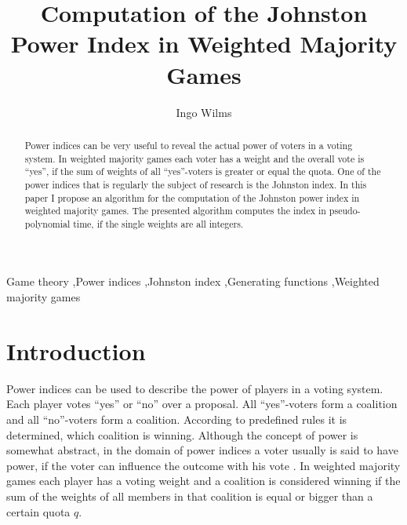 \documentclass[review]{elsarticle}
\theoremstyle{defn}
\theoremstyle{Pseudo-Code}
\begin{document}
\begin{frontmatter}

\title{Computation of the Johnston Power Index in Weighted Majority Games}

\author{Ingo Wilms}




\begin{abstract}
Power indices can be very useful to reveal the actual power of voters in a voting system. In weighted majority games each voter has a weight and the overall vote is ``yes'', if the sum of weights of all ``yes''-voters is greater or equal the quota.
One of the power indices that is regularly the subject of research is the Johnston index.
In this paper I propose an algorithm for the computation of the Johnston power index in weighted majority games.
The presented algorithm computes the index in pseudo-polynomial time, if the single weights are all integers. 
\end{abstract}

\begin{keyword}
Game theory \sep Power indices \sep Johnston index \sep Generating functions \sep Weighted majority games
\end{keyword}

\end{frontmatter}



\section{Introduction}
\label{intro}
Power indices can be used to describe the power of players in a voting system. Each player votes ``yes'' or ``no'' over a proposal. All ``yes''-voters form a coalition and all ``no''-voters form a coalition. According to predefined rules it is determined, which coalition is winning. 
Although the concept of power is somewhat abstract, in the domain of power indices a voter usually is said to have power, if the voter can influence the outcome with his vote \citep{Penrose1946}.
 In weighted majority games each player has a voting weight and a coalition is considered winning if the sum of the weights of all members in that coalition is equal or bigger than a certain quota $q$.
\end{document}
